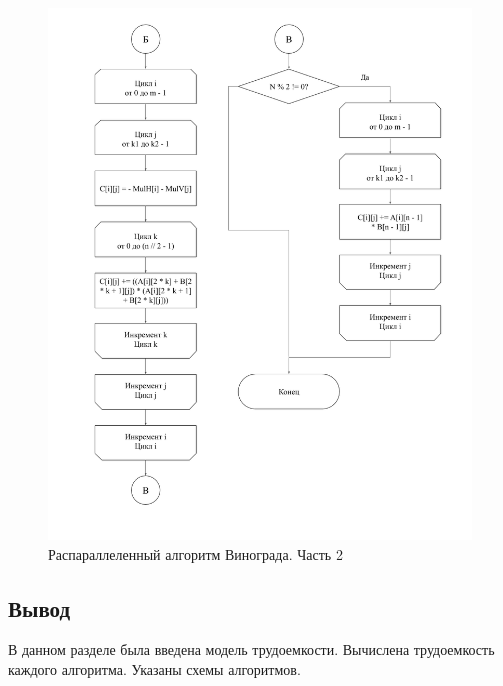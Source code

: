\documentclass[../main.tex]{subfiles}
\begin{document}
	\begin{figure}[H]
		\centering
		\includegraphics[scale=0.5]{img/Winiger2}
		\caption[Распараллеленный алгоритм Винограда. Часть 2]{Распараллеленный алгоритм Винограда. Часть 2}
		\label{fig:winiger2}
	\end{figure}
	
\subsection{Вывод}
	
	В данном разделе была введена модель трудоемкости. Вычислена трудоемкость каждого алгоритма. Указаны схемы алгоритмов.
\end{document}
